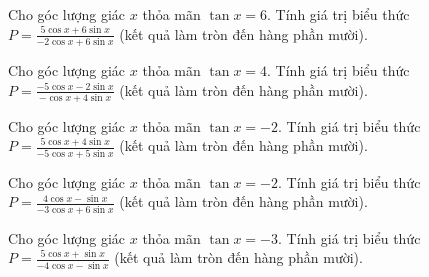 \documentclass[12pt,a4paper]{article}
\begin{document}
\begin{ex}[Cho tanx (hoặc cotx). Tìm P=(asinx+bcosx)/(csinx+dcosx)]
 Cho góc lượng giác ${x}$ thỏa mãn $\tan x=6$. Tính giá trị biểu thức $P=\frac{5 \cos x + 6 \sin x}{- 2 \cos x + 6 \sin x}$ (kết quả làm tròn đến hàng phần mười).\\ 

\end{ex}

\begin{ex}
 Cho góc lượng giác ${x}$ thỏa mãn $\tan x=4$. Tính giá trị biểu thức $P=\frac{- 5 \cos x - 2 \sin x}{- \cos x + 4 \sin x}$ (kết quả làm tròn đến hàng phần mười).\\ 

\end{ex}

\begin{ex}
 Cho góc lượng giác ${x}$ thỏa mãn $\tan x=-2$. Tính giá trị biểu thức $P=\frac{5 \cos x + 4 \sin x}{- 5 \cos x + 5 \sin x}$ (kết quả làm tròn đến hàng phần mười).\\ 

\end{ex}

\begin{ex}
 Cho góc lượng giác ${x}$ thỏa mãn $\tan x=-2$. Tính giá trị biểu thức $P=\frac{4 \cos x - \sin x}{- 3 \cos x + 6 \sin x}$ (kết quả làm tròn đến hàng phần mười).\\ 

\end{ex}

\begin{ex}
 Cho góc lượng giác ${x}$ thỏa mãn $\tan x=-3$. Tính giá trị biểu thức $P=\frac{5 \cos x + \sin x}{- 4 \cos x - \sin x}$ (kết quả làm tròn đến hàng phần mười).\\ 

\end{ex}
\end{document}
